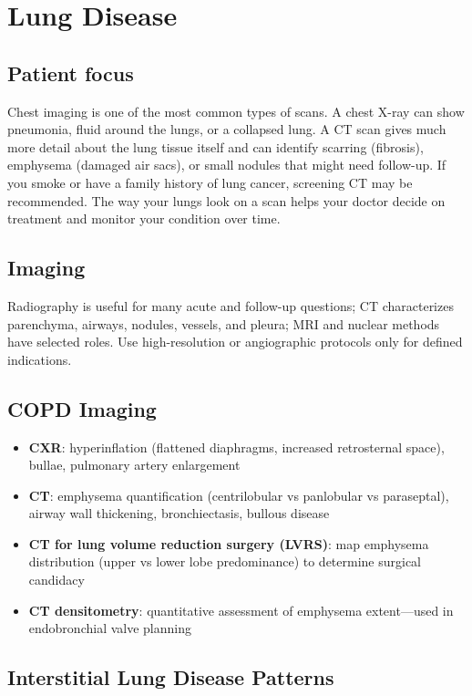 \chapter{Lung Disease}

\section*{Patient focus}
Chest imaging is one of the most common types of scans. A chest X-ray can show pneumonia, fluid around the lungs, or a collapsed lung. A CT scan gives much more detail about the lung tissue itself and can identify scarring (fibrosis), emphysema (damaged air sacs), or small nodules that might need follow-up. If you smoke or have a family history of lung cancer, screening CT may be recommended. The way your lungs look on a scan helps your doctor decide on treatment and monitor your condition over time.


\label{ch:ch62_lung_disease}

\section{Imaging}
Radiography is useful for many acute and follow-up questions; CT characterizes parenchyma, airways, nodules, vessels, and pleura; MRI and nuclear methods have selected roles. Use high-resolution or angiographic protocols only for defined indications.

\section{COPD Imaging}
\begin{itemize}
  \item \textbf{CXR}: hyperinflation (flattened diaphragms, increased retrosternal space), bullae, pulmonary artery enlargement
  \item \textbf{CT}: emphysema quantification (centrilobular vs panlobular vs paraseptal), airway wall thickening, bronchiectasis, bullous disease
  \item \textbf{CT for lung volume reduction surgery (LVRS)}: map emphysema distribution (upper vs lower lobe predominance) to determine surgical candidacy
  \item \textbf{CT densitometry}: quantitative assessment of emphysema extent---used in endobronchial valve planning
\end{itemize}

\section{Interstitial Lung Disease Patterns}


